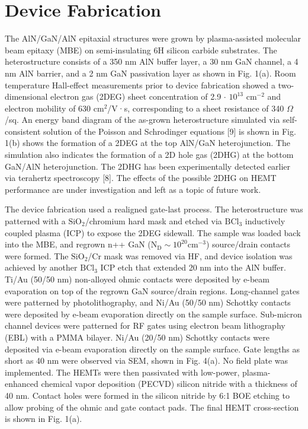 \documentclass[journal]{IEEEtran}
\begin{document}
\section{Device Fabrication}
The AlN/GaN/AlN epitaxial structures were grown by plasma-assisted molecular beam epitaxy (MBE) on semi-insulating 6H silicon carbide substrates. The heterostructure consists of a 350 nm AlN buffer layer, a 30 nm GaN channel, a 4 nm AlN barrier, and a 2 nm GaN passivation layer as shown in Fig. 1(a). Room temperature Hall-effect measurements prior to device fabrication showed a two-dimensional electron gas (2DEG) sheet concentration of 2.9 $\cdot$ $\mathrm{10^{13}}$ $\mathrm{cm^{-2}}$ and electron mobility of 630 $\mathrm{cm^2}$/V·s, corresponding to a sheet resistance of 340 $\Omega$/sq. An energy band diagram of the as-grown heterostructure simulated via self-consistent solution of the Poisson and Schrodinger equations [9] is shown in Fig. 1(b) shows the formation of a 2DEG at the top AlN/GaN heterojunction. The simulation also indicates the formation of a 2D hole gas (2DHG) at the bottom GaN/AlN heterojunction. The 2DHG has been experimentally detected earlier via terahertz spectroscopy [8]. The effects of the possible 2DHG on HEMT performance are under investigation and left as a topic of future work.

The device fabrication used a realigned gate-last process. The heterostructure was patterned with a $\mathrm{SiO_2}$/chromium hard mask and etched via $\mathrm{BCl_3}$ inductively coupled plasma (ICP) to expose the 2DEG sidewall. The sample was loaded back into the MBE, and regrown n++ GaN ($\mathrm{N_D}\sim10^{20} \mathrm{cm^{-3}}$) source/drain contacts were formed. The $\mathrm{SiO_2}$/Cr mask was removed via HF, and device isolation was achieved by another $\mathrm{BCl_3}$ ICP etch that extended 20 nm into the AlN buffer. Ti/Au (50/50 nm) non-alloyed ohmic contacts were deposited by e-beam evaporation on top of the regrown GaN source/drain regions. Long-channel gates were patterned by photolithography, and Ni/Au (50/50 nm) Schottky contacts were deposited by e-beam evaporation directly on the sample surface. Sub-micron channel devices were patterned for RF gates using electron beam lithography (EBL) with a PMMA bilayer. Ni/Au (20/50 nm) Schottky contacts were deposited via e-beam evaporation directly on the sample surface. Gate lengths as short as 40 nm were observed via SEM, shown in Fig. 4(a). No field plate was implemented. The HEMTs were then passivated with low-power, plasma-enhanced chemical vapor deposition (PECVD) silicon nitride with a thickness of 40 nm. Contact holes were formed in the silicon nitride by 6:1 BOE etching to allow probing of the ohmic and gate contact pads. The final HEMT cross-section is shown in Fig. 1(a).
\end{document}
